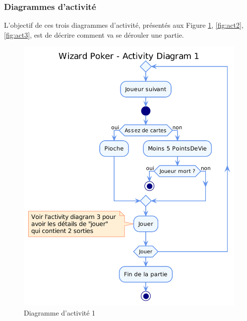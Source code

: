 \documentclass[11pt,a4paper]{article}
\begin{document}
\subsubsection{Diagrammes d'activité}
L'objectif de ces trois diagrammes d'activité, présentés aux Figure \ref{fig:act1}, \ref{fig:act2}, \ref{fig:act3}, est de décrire comment va se dérouler une partie.
\begin{figure}[ht]
  \centering
  \includegraphics[width=1\textwidth]{../uml_files/ActivityDiagram.png}
  \caption{\label{fig:act1} Diagramme d'activité 1}
\end{figure}
\end{document}
